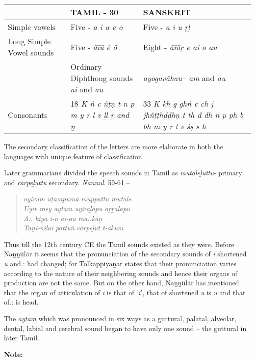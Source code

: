 \begin{longtable}{|p{2.8cm}|p{2.8cm}|p{2.8cm}|}
\hline
 & TAMIL  - 30 & SANSKRIT \\
\hline
Simple vowels & Five  - \textit{a i u e o} & Five - \textit{a i u ṛḻ} \tabularnewline
\hline
Long Simple Vowel sounds & Five - \textit{āīū ê ô} & Eight - \textit{āīūṛ e ai o au} \tabularnewline
\hline
 & Ordinary Diphthong sounds \textit{ai} and \textit{au} & \textit{ayogavāhau– am} and \textit{au} \tabularnewline
\hline
Consonants & 18 \textit{K ṅ c ñṭṇ t  n  p m y r l v ḻḻ ṟ and ṉ} & 33 \textit{K kh g ghṅ c ch j jhñṭṭhḍḍhṇ t th d dh n p ph b bh m y r l v śṣ s h} \tabularnewline
\hline
\end{longtable}

The secondary classification of the letters are more elaborate in both the languages with unique feature of classification.

Later grammarians divided the speech sounds in Tamil as \textit{mutaleḻuttu}- primary and \textit{cārpeḻuttu} secondary. \textit{Nannūl}. 59-61 –

\begin{verse}
\textit{uyirum uṭampumā muppattu mutale}.\\\textit{Uyir mey āytam uyiraḻapu oṟṟalapu}\\\textit{A:. kiya i-u ai-au ma:.kāṉ}\\\textit{Taṉi-nilai pattuñ cārpeḻut t-ākum} 
\end{verse}

Thus till the 12th century CE the Tamil sounds existed as they were. Before Naṉṉūlār it seems that the pronunciation of the secondary sounds of \textit{i} shortened \textit{u} and.: had changed; for Tolkāppiyaṉār states that their pronunciation varies according to the nature of their neighboring sounds and hence their organs of production are not the same. But on the other hand, Naṉṉūlār has mentioned that the organ of articulation of \textit{i} is that of ‘\textit{i}’, that of shortened \textit{u} is \textit{u} and that of.: is head.

The \textit{āytam} which was pronounced in six ways as a guttural, palatal, alveolar, dental, labial and cerebral sound began to have only one sound – the guttural in later Tamil.

\textbf{Note:}

